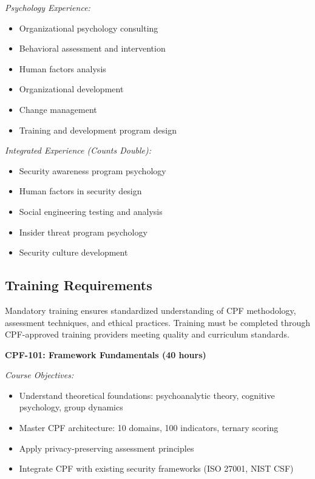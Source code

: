 \documentclass[11pt,a4paper]{article}
\begin{document}
\textit{Psychology Experience:}
\begin{itemize}
\item Organizational psychology consulting
\item Behavioral assessment and intervention
\item Human factors analysis
\item Organizational development
\item Change management
\item Training and development program design
\end{itemize}

\textit{Integrated Experience (Counts Double):}
\begin{itemize}
\item Security awareness program psychology
\item Human factors in security design
\item Social engineering testing and analysis
\item Insider threat program psychology
\item Security culture development
\end{itemize}

\subsection{Training Requirements}

Mandatory training ensures standardized understanding of CPF methodology, assessment techniques, and ethical practices. Training must be completed through CPF-approved training providers meeting quality and curriculum standards.

\textbf{CPF-101: Framework Fundamentals (40 hours)}

\textit{Course Objectives:}
\begin{itemize}
\item Understand theoretical foundations: psychoanalytic theory, cognitive psychology, group dynamics
\item Master CPF architecture: 10 domains, 100 indicators, ternary scoring
\item Apply privacy-preserving assessment principles
\item Integrate CPF with existing security frameworks (ISO 27001, NIST CSF)
\end{itemize}
\end{document}
